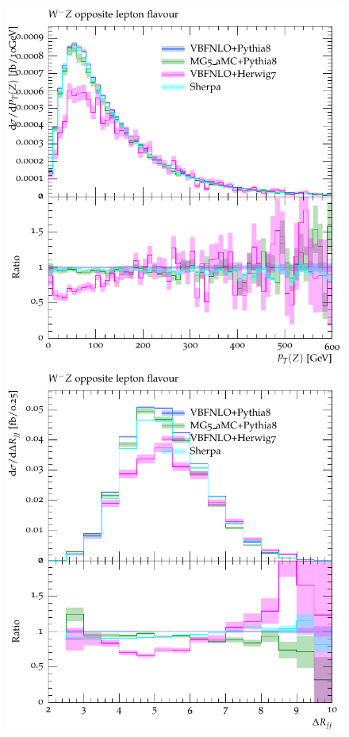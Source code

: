 \begin{figure}[htbp]
\begin{center}
   \includegraphics[scale=0.65]{figs/VBFNLO_WmZ_OF_ZPt}
   \includegraphics[scale=0.65]{figs/VBFNLO_WmZ_OF_dRjj}

\end{center}
\end{figure}
